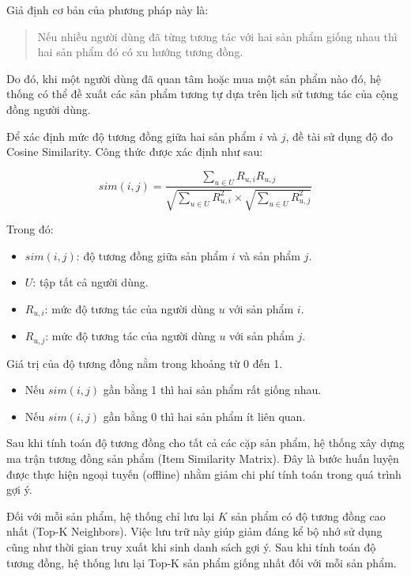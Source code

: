 \documentclass{report}
\begin{document}
Giả định cơ bản của phương pháp này là:

\begin{quote}
Nếu nhiều người dùng đã từng tương tác với hai sản phẩm giống nhau thì hai sản phẩm đó có xu hướng tương đồng.
\end{quote}

Do đó, khi một người dùng đã quan tâm hoặc mua một sản phẩm nào đó, hệ thống có thể đề xuất các sản phẩm tương tự dựa trên lịch sử tương tác của cộng đồng người dùng.

Để xác định mức độ tương đồng giữa hai sản phẩm $i$ và $j$, đề tài sử dụng độ đo Cosine Similarity. Công thức được xác định như sau:

\[
sim(i,j)
=
\frac
{\sum\limits_{u \in U} R_{u,i}R_{u,j}}
{\sqrt{\sum\limits_{u \in U} R_{u,i}^{2}}
 \times
 \sqrt{\sum\limits_{u \in U} R_{u,j}^{2}}}
\]

Trong đó:

\begin{itemize}
\item $sim(i,j)$: độ tương đồng giữa sản phẩm $i$ và sản phẩm $j$.
\item $U$: tập tất cả người dùng.
\item $R_{u,i}$: mức độ tương tác của người dùng $u$ với sản phẩm $i$.
\item $R_{u,j}$: mức độ tương tác của người dùng $u$ với sản phẩm $j$.
\end{itemize}

Giá trị của độ tương đồng nằm trong khoảng từ 0 đến 1.

\begin{itemize}
\item Nếu $sim(i,j)$ gần bằng 1 thì hai sản phẩm rất giống nhau.
\item Nếu $sim(i,j)$ gần bằng 0 thì hai sản phẩm ít liên quan.
\end{itemize}

Sau khi tính toán độ tương đồng cho tất cả các cặp sản phẩm, hệ thống xây dựng ma trận tương đồng sản phẩm (Item Similarity Matrix). Đây là bước huấn luyện được thực hiện ngoại tuyến (offline) nhằm giảm chi phí tính toán trong quá trình gợi ý.

Đối với mỗi sản phẩm, hệ thống chỉ lưu lại $K$ sản phẩm có độ tương đồng cao nhất (Top-K Neighbors). Việc lưu trữ này giúp giảm đáng kể bộ nhớ sử dụng cũng như thời gian truy xuất khi sinh danh sách gợi ý.
Sau khi tính toán độ tương đồng, hệ thống lưu lại Top-K sản phẩm giống nhất đối với mỗi sản phẩm.
\end{document}
